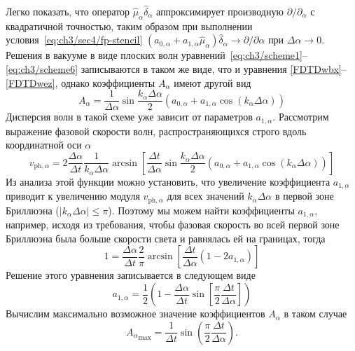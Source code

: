 Легко показать, что оператор $\hat{\mu}_\alpha\hat{\delta}_\alpha$ аппроксимирует производную $\partial/\partial_\alpha$ с квадратичной точностью, таким образом при выполнении условия~\eqref{eq:ch3/sec4/fp-stencil} ${(a_{0,\alpha}+a_{1,\alpha}\hat{\mu}_\alpha)\hat{\delta}_\alpha\to \partial/\partial\alpha}$ при $\Delta\alpha\to 0$.
Решения в вакууме в виде плоских волн уравнений~\eqref{eq:ch3/scheme1}--\eqref{eq:ch3/scheme6} записываются в таком же виде, что и уравнения \eqref{FDTDwbx}--\eqref{FDTDwez}, однако коэффициенты $A_\alpha$ имеют другой вид
\begin{equation}
    A_\alpha = \frac{1}{\Delta\alpha}\sin{\frac{k_\alpha\Delta \alpha}{2}} \left( a_{0,\alpha}+a_{1,\alpha}\cos{(k_\alpha\Delta\alpha)} \right)
\end{equation}
Дисперсия волн в такой схеме уже зависит от параметров $a_{1,\alpha}$.
Рассмотрим выражение фазовой скорости волн, распространяющихся строго вдоль координатной оси $\alpha$
\begin{equation}
    v_{\mathrm{ph},\alpha} = 2\frac{\Delta \alpha}{\Delta t}\frac{1}{k_\alpha \Delta \alpha} \arcsin{\left[\frac{\Delta t}{\Delta\alpha}\sin{\frac{k_\alpha\Delta \alpha}{2}} \left( a_{0,\alpha}+a_{1,\alpha}\cos{(k_\alpha\Delta\alpha)}\right) \right]}    
\end{equation}
Из анализа этой функции можно установить, что увеличение коэффициента $a_{1,\alpha}$ приводит к увеличению модуля $v_{\mathrm{ph},\alpha}$ для всех значений $k_\alpha \Delta\alpha$ в первой зоне Бриллюэна ($|k_\alpha \Delta\alpha| \leq \pi$).
Поэтому мы можем найти коэффициенты $a_{1,\alpha}$, например, исходя из требования, чтобы фазовая скорость во всей первой зоне Бриллюэна была больше скорости света и равнялась ей на границах, тогда
\begin{equation}
    1 = \frac{\Delta \alpha}{\Delta t}\frac{2}{\pi} \arcsin{\left[\frac{\Delta t}{\Delta\alpha}\left( 1 - 2 a_{1,\alpha}\right) \right]}
\end{equation}
Решение этого уравнения записывается в следующем виде
\begin{equation}
    a_{1,\alpha} = \frac{1}{2} \left( 1 - \frac{\Delta \alpha}{\Delta t} \sin{ \left[ \frac{\pi}{2} \frac{\Delta t}{\Delta \alpha} \right]} \right)
\end{equation}
Вычислим максимально возможное значение коэффициентов $A_\alpha$ в таком случае
\begin{equation}
    {A_\alpha}_\mathrm{max} = \frac{1}{\Delta t} \sin{ \left( \frac{\pi}{2} \frac{\Delta t}{\Delta \alpha} \right) }.
\end{equation}
